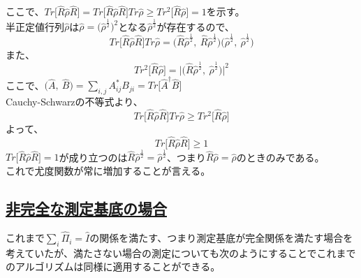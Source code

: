 \documentclass[11pt,a4j,notitlepage]{jreport}
\begin{document}
	ここで、$Tr \big[ \hat{R} \hat{\rho} \hat{R} \big] = Tr \big[ \hat{R} \hat{\rho} \hat{R} \big] Tr \hat{\rho} \geq Tr^2 \big[ \hat{R} \hat{\rho} \big] = 1$を示す。\\
	半正定値行列$\hat{\rho}$は$\hat{\rho} = \big( \hat{\rho}^{\frac{1}{2}} \big)^2$となる$\hat{\rho}^{\frac{1}{2}}$が存在するので、
	\begin{equation}
		Tr \big[ \hat{R} \hat{\rho} \hat{R} \big] Tr \hat{\rho} = \Big( \hat{R} \hat{\rho}^{\frac{1}{2}},\ \hat{R} \hat{\rho}^{\frac{1}{2}} \Big) \Big( \hat{\rho}^{\frac{1}{2}},\ \hat{\rho}^{\frac{1}{2}} \Big)
	\end{equation}
	また、
	\begin{equation}
		Tr^2 \big[ \hat{R} \hat{\rho} \big] = \Big| \Big( \hat{R} \hat{\rho}^{\frac{1}{2}},\ \hat{\rho}^{\frac{1}{2}} \Big) \Big|^2
	\end{equation}
	ここで、$\big( \hat{A},\ \hat{B} \big) = \sum_{i,j} A^*_{ij} B_{ji} = Tr \big[ \hat{A}^\dagger \hat{B} \big]$\\
	Cauchy-Schwarzの不等式より、
	\begin{equation}
		Tr \big[ \hat{R} \hat{\rho} \hat{R} \big] Tr \hat{\rho} \geq Tr^2 \big[ \hat{R} \hat{\rho} \big]
	\end{equation}
	よって、
	\begin{equation}
		Tr \big[ \hat{R} \hat{\rho} \hat{R} \big] \geq 1
	\end{equation}
	$Tr \big[ \hat{R} \hat{\rho} \hat{R} \big] = 1$が成り立つのは$\hat{R} \hat{\rho}^{\frac{1}{2}} = \hat{\rho}^{\frac{1}{2}}$、つまり$\hat{R} \hat{\rho} = \hat{\rho}$のときのみである。\\

	これで尤度関数が常に増加することが言える。

	\subsection*{\underline{非完全な測定基底の場合}}

	これまで$\sum_i \hat{\Pi}_i = \hat{I}$の関係を満たす、つまり測定基底が完全関係を満たす場合を考えていたが、満たさない場合の測定についても次のようにすることでこれまでのアルゴリズムは同様に適用することができる。\\
\end{document}

